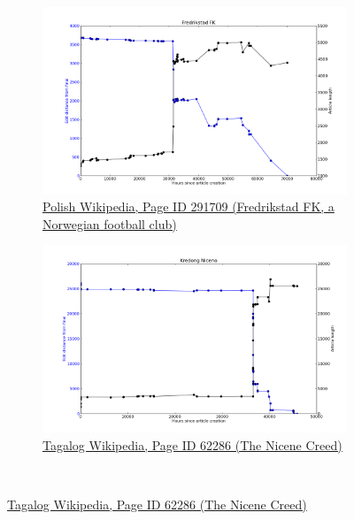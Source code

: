 \begin{figure}
{\begin{subfigure}[b!]{0.6\linewidth}
      \centering
      \includegraphics[width=\linewidth]{img/traj-classic/pl291709traj.png}
      \caption{\href{http://pl.wikipedia.org/wiki/index.php?curid=291709}{Polish
      Wikipedia, Page ID 291709 (Fredrikstad FK, a Norwegian football
      club)}}
      \label{fig:fredrikstad}
    \end{subfigure}
    \begin{subfigure}[b!]{0.6\linewidth}
      \centering
      \includegraphics[width=\linewidth]{img/traj-classic/tl62286traj.png}
      \caption{\href{http://tl.wikipedia.org/wiki/index.php?curid=62286}{Tagalog
      Wikipedia, Page ID 62286 (The Nicene Creed)}}
      \label{fig:nicine-creed}
    \end{subfigure}
  }\\
\end{figure}

